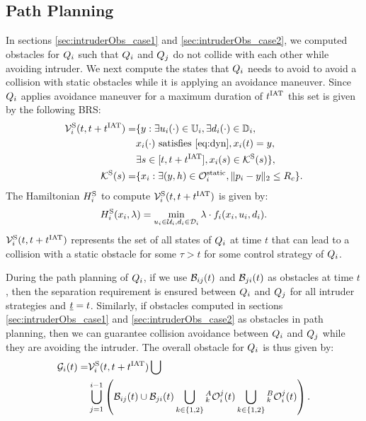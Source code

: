 \subsection{Path Planning} \label{sec:path_planning}
In sections \ref{sec:intruderObs_case1} and \ref{sec:intruderObs_case2}, we computed obstacles for $Q_i$ such that $Q_i$ and $Q_j$ do not collide with each other while avoiding intruder. We next compute the states that $Q_i$ needs to avoid to avoid a collision with static obstacles while it is applying an avoidance maneuver. Since $Q_i$ applies avoidance maneuver for a maximum duration of $t^\text{IAT}$ this set is given by the following BRS:
\begin{equation} \label{eq:ObsBRS_static}
\begin{aligned}
\brs^{\text{S}}_{i}(t, t+\iat) = & \{y: \exists \ctrl_i(\cdot) \in \cfset_i, \exists \dstb_i(\cdot) \in \dfset_i, \\
& \state_i(\cdot) \text{ satisfies \eqref{eq:dyn}}, \state_i(t) = y, \\
& \exists s \in [t, t+\iat], \state_i(s) \in \mathcal{K}^{\text{S}}(s) \},\\
\mathcal{K}^{\text{S}}(s) = & \{\state_i: \exists (y, h) \in \soset_i, \|\pos_i - y\|_2 \le \rc \}.
\end{aligned}
\end{equation}
The Hamiltonian $H^{\text{S}}_{i}$ to compute $\mathcal{V}^{\text{S}}_{i}(t, t+t^\text{IAT})$ is given by:
\begin{equation} \label{eqn:BRS_obsham_static}
\ham^{\text{S}}_{i}(\state_i, \costate) = \min_{\ctrl_i \in \cset_i, \dstb_i \in \dset_i} \costate \cdot f_i (\state_i, \ctrl_i, \dstb_i).
\end{equation}
$\mathcal{V}^{\text{S}}_{i}(t, t+t^\text{IAT})$ represents the set of all states of $Q_i$ at time $t$ that can lead to a collision with a static obstacle for some $\tau > t$ for some control strategy of $Q_i$.

During the path planning of $Q_i$, if we use $\mathcal{B}_{ij}(t)$ and $\mathcal{B}_{ji}(t)$ as obstacles at time $t$, then the separation requirement is ensured between $Q_i$ and $Q_j$ for all intruder strategies and $\underline{t} = t$. Similarly, if obstacles computed in sections \ref{sec:intruderObs_case1} and \ref{sec:intruderObs_case2} as obstacles in path planning, then we can guarantee collision avoidance between $Q_i$ and $Q_j$ while they are avoiding the intruder. The overall obstacle for $Q_i$ is thus given by:
\begin{equation} \label{eq:obsseti_intr}
\begin{aligned}
\obsset_i(t)  =  & \brs^{\text{S}}_{i}(t, t+\iat) \bigcup \\
& \bigcup_{j=1}^{i-1} \left( \buff_{ij}(t) \cup \buff_{ji}(t) \bigcup_{k \in\{1, 2\}} {}_k^A\ioset_i^j(t) \bigcup_{k \in\{1, 2\}} {}_k^B\ioset_i^j(t) \right).
\end{aligned}
\end{equation}

